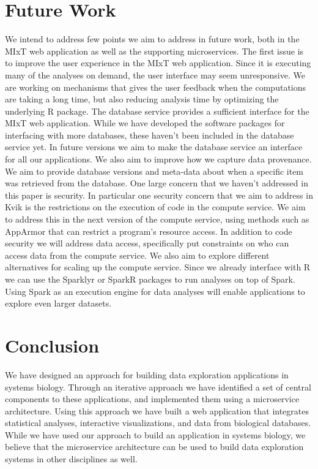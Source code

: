 \section{Future Work} 
We intend to address few points we aim to address in future work, both in the
MIxT web application as well as the supporting microservices.  The first issue
is to improve the user experience in the MIxT web application.  Since it is
executing many of the analyses on demand, the user interface may seem
unresponsive. We are working on mechanisms that gives the user feedback when the
computations are taking a long time, but also reducing analysis time by
optimizing the underlying R package.  The database service provides a sufficient
interface for the MIxT web application. While we have developed the software
packages for interfacing with more databases, these haven't been included in the
database service yet. In future versions we aim to make the database service an
interface for all our applications.  We also aim to improve how we capture data
provenance. We aim to provide database versions and meta-data about when a
specific item was retrieved from the database.  One large concern that we
haven't addressed in this paper is security. In particular one security concern
that we aim to address in Kvik is the restrictions on the execution of code in
the compute service. We aim to address this in the next version of the compute
service, using methods such as AppArmor\cite{apparmor} that can
restrict a program's resource access. In addition to code security we will
address data access, specifically put constraints on who can access data from
the compute service.  We also aim to explore different alternatives for scaling
up the compute service.  Since we already interface with R we can use the
Sparklyr\cite{sparklyr} or SparkR\cite{sparkr} packages to run analyses on top
of Spark.\cite{zaharia2010spark} Using Spark as an execution engine for data
analyses will enable applications to explore even larger datasets.

\section{Conclusion}
We have designed an approach for building data exploration applications in
systems biology. Through an iterative approach we have identified a set of
central components to these applications, and implemented them using a
microservice architecture. Using this approach we have built a web application
that integrates statistical analyses, interactive visualizations, and data from
biological databases. While we have used our approach to build an application in
systems biology, we believe that the microservice architecture can be used to
build data exploration systems in other disciplines as well. 


